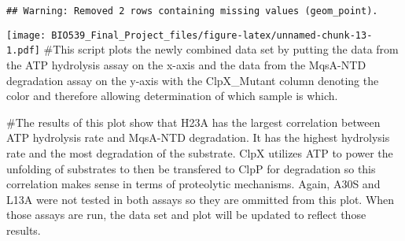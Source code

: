\documentclass[]{article}
\begin{document}
\begin{verbatim}
## Warning: Removed 2 rows containing missing values (geom_point).
\end{verbatim}

\texttt{[image: BIO539\_Final\_Project\_files/figure-latex/unnamed-chunk-13-1.pdf]}
\#This script plots the newly combined data set by putting the data from
the ATP hydrolysis assay on the x-axis and the data from the MqsA-NTD
degradation assay on the y-axis with the ClpX\_Mutant column denoting
the color and therefore allowing determination of which sample is which.

\#The results of this plot show that H23A has the largest correlation
between ATP hydrolysis rate and MqsA-NTD degradation. It has the highest
hydrolysis rate and the most degradation of the substrate. ClpX utilizes
ATP to power the unfolding of substrates to then be transfered to ClpP
for degradation so this correlation makes sense in terms of proteolytic
mechanisms. Again, A30S and L13A were not tested in both assays so they
are ommitted from this plot. When those assays are run, the data set and
plot will be updated to reflect those results.
\end{document}
